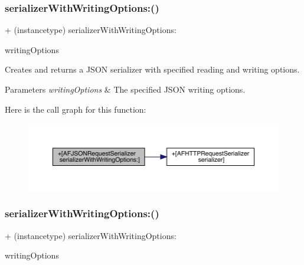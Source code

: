 \subsubsection{\texorpdfstring{serializer\+With\+Writing\+Options\+:()}{serializerWithWritingOptions:()}\hspace{0.1cm}{\footnotesize\ttfamily [1/3]}}
{\footnotesize\ttfamily + (instancetype) serializer\+With\+Writing\+Options\+: \begin{DoxyParamCaption}\item[{(N\+S\+J\+S\+O\+N\+Writing\+Options)}]{writing\+Options }\end{DoxyParamCaption}}

Creates and returns a J\+S\+ON serializer with specified reading and writing options.


\begin{DoxyParams}{Parameters}
{\em writing\+Options} & The specified J\+S\+ON writing options. \\
\hline
\end{DoxyParams}
Here is the call graph for this function\+:\nopagebreak
\begin{figure}[H]
\begin{center}
\leavevmode
\includegraphics[width=350pt]{interface_a_f_j_s_o_n_request_serializer_a53962511f37e48990159af5bc8959c30_cgraph}
\end{center}
\end{figure}
\mbox{\label{interface_a_f_j_s_o_n_request_serializer_a53962511f37e48990159af5bc8959c30}} 
\subsubsection{\texorpdfstring{serializer\+With\+Writing\+Options\+:()}{serializerWithWritingOptions:()}\hspace{0.1cm}{\footnotesize\ttfamily [2/3]}}
{\footnotesize\ttfamily + (instancetype) serializer\+With\+Writing\+Options\+: \begin{DoxyParamCaption}\item[{(N\+S\+J\+S\+O\+N\+Writing\+Options)}]{writing\+Options }\end{DoxyParamCaption}}

